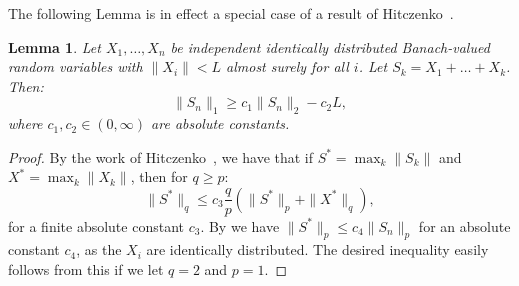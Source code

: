 \documentclass[12pt]{amsart}
\def\oo{\infty}
\theoremstyle{definition}
\theoremstyle{plain}
\newtheorem{lem}{Lemma}
\theoremstyle{remark}
\begin{document}
The following Lemma is in effect a special case of a result of
Hitczenko~\cite{Hitczenko}.

\begin{lem}\label{lem:Rosenthal}
        Let $X_1,\dots,X_n$ be independent identically distributed 
	Banach-valued
        random variables with $\| X_i \|<L$ almost surely for all
        $i$.  Let $S_k=X_1+\dots+X_k$.  Then:
\[
        \| S_n \|_1 \ge c_1 \| S_n \|_2 - c_2 L,
\]
        where $c_1,c_2\in (0,\oo)$ are absolute constants.
\end{lem}

\begin{proof}
By the work of Hitczenko~\cite{Hitczenko}, we have
that
if $S^* = \max_{k}\|S_k\|$ and
$X^* = \max_k\|X_k\|$, then for $q \ge p$:
$$ \|S^*\|_q \le c_3 \frac qp ( \|S^*\|_p + \|X^*\|_q ),$$
for a finite absolute constant $c_3$.  By 
\cite[Corollary~4]{MS} we have $\| S^* \|_p \le c_4 \| S_n \|_p$ for an
absolute constant $c_4$, as the $X_i$ are identically distributed.
The
desired inequality easily follows from this
if we let $q=2$ and $p=1$.
\end{proof}
\end{document}
